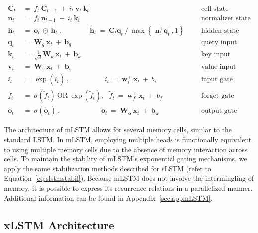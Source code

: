 \begin{align}
\label{eq:mlstm_recurrent_begin}
\mathbf{C}_t \ &= \  f_t \ \mathbf{C}_{t-1} \ + \ 
  i_t \ \mathbf{v}_t \ \mathbf{k}_t^\top & &  &\text{cell state} \\
\mathbf{n}_t \ &= \  f_t \ \mathbf{n}_{t-1} \ + \ 
  i_t \ \mathbf{k}_t & &  &\text{normalizer state} \\
\mathbf{h}_t  \ &= \ \mathbf{o}_t \ \odot \ \tilde{\mathbf{h}}_t
\ , \qquad \qquad 
\tilde{\mathbf{h}}_t \ = \   \mathbf{C}_t \mathbf{q}_t \ / \ 
  \max \left\{ |\mathbf{n}_t^\top \mathbf{q}_t|, 1 \right\} 
   &&&\text{hidden state} \\
\mathbf{q}_t \ &= \ \mathbf{W}_q \ \mathbf{x}_t \ + \ \mathbf{b}_q  & &  &\text{query input} \\
\mathbf{k}_t \ &= \ \frac{1}{\sqrt{d}} \mathbf{W}_k \ \mathbf{x}_t \ + \ \mathbf{b}_k  & &  &\text{key input} \\
\mathbf{v}_t \ &= \ \mathbf{W}_v \ \mathbf{x}_t \ + \ \mathbf{b}_v  & &  &\text{value input} \\
i_t \ &= \ \!\exp \!  \! \left( \tilde{i}_t  \right) \ , 
 \qquad \qquad \ \ \ \ \,
  \tilde{i}_t \ = \ \mathbf{w}^\top_{i} \ \mathbf{x}_t \ + \  b_{i} \ \ \ 
  &&&\text{input gate} \\
f_t \ &= \ \sigma \!  \left(  \tilde{f}_t \right) \ \text{OR} \ \!\exp \!  \! \left(  \tilde{f}_t \right) , \ \ \: \!
\tilde{f}_t \ = \ \mathbf{w}^\top_{f} \ \mathbf{x}_t  \ + \
  b_{f}
  &&& \text{forget gate} \\
\label{eq:mlstm_recurrent_end}
\mathbf{o}_t \ &= \ \sigma \left( \tilde{\mathbf{o}}_t \right) \ , \qquad \qquad \quad \ \ \ \,
  \tilde{\mathbf{o}}_t  \ = \ \mathbf{W}_{\mathbf{o}} \ \mathbf{x}_t \ + \
  \mathbf{b}_{\mathbf{o}}
  &&&\text{output gate} 
\end{align}

The architecture of mLSTM allows for several memory cells, similar to the standard LSTM. In mLSTM, employing multiple heads is functionally equivalent to using multiple memory cells due to the absence of memory interaction across cells. To maintain the stability of mLSTM's exponential gating mechanisms, we apply the same stabilization methods described for sLSTM (refer to Equation~\ref{eq:slstmstabil}). Because mLSTM does not involve the intermingling of memory, it is possible to express its recurrence relations in a parallelized manner. Additional information can be found in Appendix~\ref{sec:appmLSTM}.

\subsection{xLSTM Architecture}
\label{sec:xLSTMarch}

